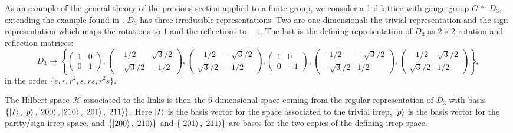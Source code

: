 \documentclass[11pt,reqno]{amsart}
\numberwithin{equation}{section}
\begin{document}
	As an example of the general theory of the previous section applied to a finite group, we consider a 1-d lattice with gauge group $G\cong D_3$, extending the example found in \cite[Appendix 1]{ZoharBurrello15}.
	$D_3$ has three irreducible representations.
	Two are one-dimensional: the trivial representation and the sign representation which maps the rotations to $1$ and the reflections to $-1$.
	The last is the defining representation of $D_3$ as $2\times 2$ rotation and reflection matrices:
		\[D_3 \mapsto \left\{ \begin{pmatrix}
		1 & 0\\ 0 & 1
		\end{pmatrix},
		\begin{pmatrix}
		-1/2 & \sqrt{3}/2\\ -\sqrt{3}/2 & -1/2
		\end{pmatrix},
		\begin{pmatrix}
		-1/2 & -\sqrt{3}/2\\ \sqrt{3}/2 & -1/2
		\end{pmatrix},
		\begin{pmatrix}
		1 & 0\\ 0 & -1
		\end{pmatrix},
		\begin{pmatrix}
		-1/2 & -\sqrt{3}/2\\ -\sqrt{3}/2 & 1/2
		\end{pmatrix},
		\begin{pmatrix}
		-1/2 & \sqrt{3}/2\\ \sqrt{3}/2 & 1/2
		\end{pmatrix} \right\}, \]
	in the order $\{e, r, r^2, s, rs, r^2s\}$.
		
	The Hilbert space $\mathcal{H}$ associated to the links is then the 6-dimensional space coming from the regular representation of $D_3$ with basis $\{ \ket{I},\ket{p},\ket{200},\ket{210},\ket{201},\ket{211} \}$.
	Here $\ket{I}$ is the basis vector for the space associated to the trivial irrep, $\ket{p}$ is the basis vector for the parity/sign irrep space, and $\{\ket{200},\ket{210}\}$ and $\{\ket{201},\ket{211}\}$ are bases for the two copies of the defining irrep space.
	
\end{document}

